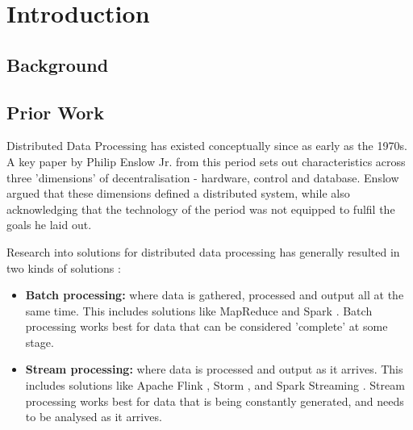 \chapter{Introduction}\label{cha:intro}


\section{Background}



\section{Prior Work}

Distributed Data Processing has existed conceptually since as early as the 1970s. A key paper by Philip Enslow Jr. from this period \cite{enslow1978distributed} sets out characteristics across three 'dimensions' of decentralisation - hardware, control and database. Enslow argued that these dimensions defined a distributed system, while also acknowledging that the technology of the period was not equipped to fulfil the goals he laid out.

Research into solutions for distributed data processing has generally resulted in two kinds of solutions \cite{yaqoob2016big}:
\begin{itemize}
	\item \textbf{Batch processing:} where data is gathered, processed and output all at the same time. This includes solutions like MapReduce \cite{dean2008mapreduce} and Spark \cite{zaharia2016spark}. Batch processing works best for data that can be considered 'complete' at some stage.
	\item \textbf{Stream processing:} where data is processed and output as it arrives. This includes solutions like Apache Flink \cite{carbone2015flink}, Storm \cite{toshniwal2014storm}, and Spark Streaming \cite{armbrust2018sparkstreaming}. Stream processing works best for data that is being constantly generated, and needs to be analysed as it arrives.
\end{itemize}

